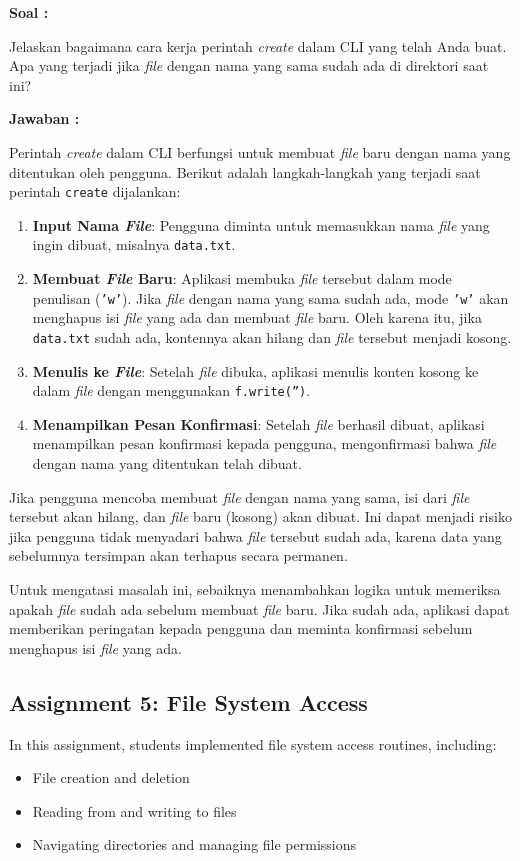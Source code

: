 \documentclass[12pt]{article}
\begin{document}
\textbf{Soal : }

Jelaskan bagaimana cara kerja perintah \textit{create} dalam CLI yang telah Anda buat. Apa yang terjadi jika \textit{file} dengan nama yang sama sudah ada di direktori saat ini?

\textbf{Jawaban : }

Perintah \textit{create} dalam CLI berfungsi untuk membuat \textit{file} baru dengan nama yang ditentukan oleh pengguna. Berikut adalah langkah-langkah yang terjadi saat perintah \texttt{create} dijalankan:

\begin{enumerate}
    \item \textbf{Input Nama \textit{File}}: Pengguna diminta untuk memasukkan nama \textit{file} yang ingin dibuat, misalnya \texttt{data.txt}.
    \item \textbf{Membuat \textit{File} Baru}: Aplikasi membuka \textit{file} tersebut dalam mode penulisan (\texttt{'w'}). Jika \textit{file} dengan nama yang sama sudah ada, mode \texttt{'w'} akan menghapus isi \textit{file} yang ada dan membuat \textit{file} baru. Oleh karena itu, jika \texttt{data.txt} sudah ada, kontennya akan hilang dan \textit{file} tersebut menjadi kosong.
    \item \textbf{Menulis ke \textit{File}}: Setelah \textit{file} dibuka, aplikasi menulis konten kosong ke dalam \textit{file} dengan menggunakan \texttt{f.write('')}.
    \item \textbf{Menampilkan Pesan Konfirmasi}: Setelah \textit{file} berhasil dibuat, aplikasi menampilkan pesan konfirmasi kepada pengguna, mengonfirmasi bahwa \textit{file} dengan nama yang ditentukan telah dibuat.
\end{enumerate}

Jika pengguna mencoba membuat \textit{file} dengan nama yang sama, isi dari \textit{file} tersebut akan hilang, dan \textit{file} baru (kosong) akan dibuat. Ini dapat menjadi risiko jika pengguna tidak menyadari bahwa \textit{file} tersebut sudah ada, karena data yang sebelumnya tersimpan akan terhapus secara permanen.

Untuk mengatasi masalah ini, sebaiknya menambahkan logika untuk memeriksa apakah \textit{file} sudah ada sebelum membuat \textit{file} baru. Jika sudah ada, aplikasi dapat memberikan peringatan kepada pengguna dan meminta konfirmasi sebelum menghapus isi \textit{file} yang ada.

\subsection{Assignment 5: File System Access}
In this assignment, students implemented file system access routines, including:
\begin{itemize}
    \item File creation and deletion
    \item Reading from and writing to files
    \item Navigating directories and managing file permissions
\end{itemize}
\end{document}
